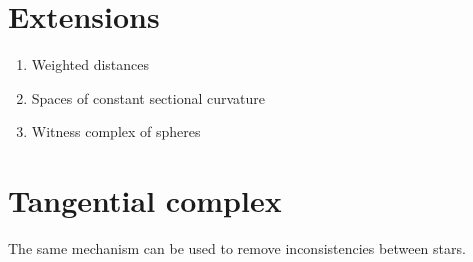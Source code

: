 \documentclass[11pt,a4paper]{article}
\begin{document}

\section{Extensions}

\begin{enumerate}
\item Weighted distances 
\item Spaces of constant sectional curvature
\item Witness complex of spheres
\end{enumerate}

\section{Tangential complex}

The same mechanism can be used to remove inconsistencies between stars.

%

%
%

\end{document}
